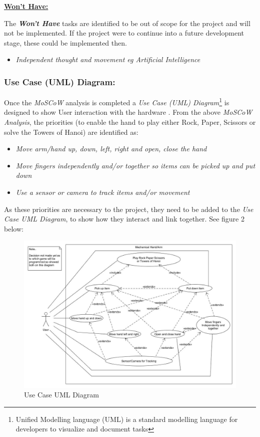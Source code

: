 \documentclass[progress]{cmpreport}
\begin{document}
\textbf{\underline{Won't Have:}} 

The \textbf{\textit{Won't Have}} tasks are identified to be out of scope for the project and will not be implemented. If the project were to continue into a future development stage, these could be implemented then.  

\begin{itemize}		
	\item \textit{Independent thought and movement eg Artificial Intelligence } 
\end{itemize}

\subsubsection{Use Case (UML) Diagram:}

Once the \textit{MoSCoW} analysis is completed a \textit{Use Case (UML) Diagram}\footnote{Unified Modelling language (UML) is a standard modelling language for developers to visualize and document tasks} is designed to show User interaction with the hardware \citep{AljamaanLBGF14}. From the above \textit{MoSCoW Analysis}, the priorities (to enable the hand to play either Rock, Paper, Scissors or solve the Towers of Hanoi) are identified as:

\begin{itemize}		
	\item \textit{Move arm/hand up, down, left, right and open, close the hand}
	\item \textit{Move fingers independently and/or together so items can be picked up and put down}
	\item \textit{Use a sensor or camera to track items and/or movement}
\end{itemize}

As these priorities are necessary to the project, they need to be added to the \textit{Use Case UML Diagram}, to show how they interact and link together. See figure 2 below: 

\begin{figure}[H] 
	\caption{Use Case UML Diagram }
	\centering
	\includegraphics[width=0.8 \textwidth, height=0.535 \textheight]{photos/UMLdiagram.jpg}
\end{figure}
\end{document}
